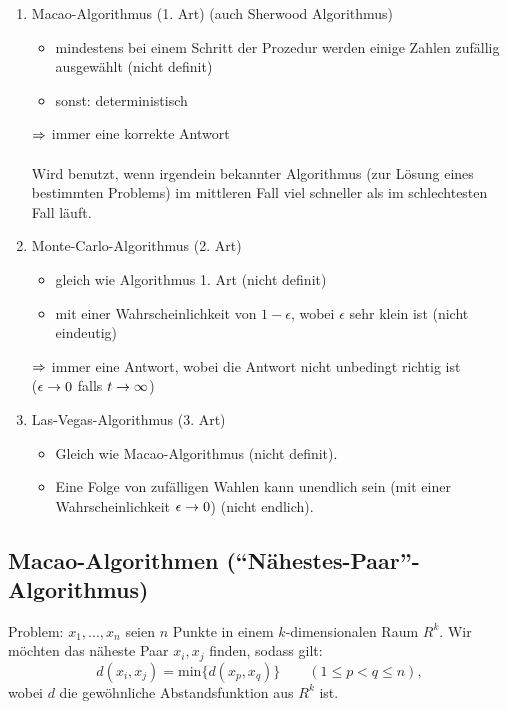 \documentclass[a4paper,twoside,DIV15,BCOR12mm]{scrbook}
\begin{document}

\begin{enumerate}
\item{Macao-Algorithmus (1. Art)} (auch Sherwood Algorithmus)

\begin{itemize}
	\item mindestens bei einem Schritt der Prozedur werden einige Zahlen zufällig ausgewählt (nicht definit)
	\item sonst: deterministisch
\end{itemize}
$\Rightarrow$ immer eine korrekte Antwort\\ \\
Wird benutzt, wenn irgendein bekannter Algorithmus (zur Lösung eines bestimmten Problems) im mittleren Fall viel schneller als im schlechtesten Fall läuft.

\item{Monte-Carlo-Algorithmus (2. Art)}

\begin{itemize}
	\item gleich wie Algorithmus 1. Art (nicht definit)
	\item mit einer Wahrscheinlichkeit von $1-\epsilon$, wobei $\epsilon$ sehr klein ist (nicht eindeutig)
\end{itemize}
$\Rightarrow$ immer eine Antwort, wobei die Antwort nicht unbedingt richtig ist\\
($\epsilon \rightarrow 0$ falls $t \rightarrow \infty$)

\item{Las-Vegas-Algorithmus (3. Art)}
\begin{itemize}
	\item Gleich wie Macao-Algorithmus (nicht definit).
	\item Eine Folge von zufälligen Wahlen kann unendlich sein (mit einer Wahrscheinlichkeit $\epsilon \rightarrow 0$) (nicht endlich).
\end{itemize}
\end{enumerate}

\subsection{Macao-Algorithmen ("`Nähestes-Paar"'-Algorithmus)}

Problem: $x_1,...,x_n$ seien $n$ Punkte in einem $k$-dimensionalen Raum $R^k$.
Wir möchten das näheste Paar $x_i, x_j$ finden, sodass gilt:
$$d(x_i, x_j) = \text{min} \{d(x_p, x_q)\} \qquad (1 \leq p < q \leq n),$$
wobei $d$ die gewöhnliche Abstandsfunktion aus $R^k$ ist.
\end{document}
